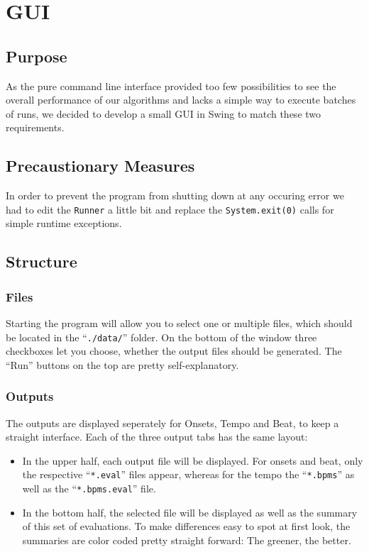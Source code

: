 \chapter{GUI} \label{cpt:gui}

\section{Purpose}
As the pure command line interface provided too few possibilities to see the
overall performance of our algorithms and lacks a simple way to execute
batches of runs, we decided to develop a small GUI in Swing to match these two
requirements.

\section{Precaustionary Measures}
In order to prevent the program from shutting down at any occuring error we had
to edit the \texttt{Runner} a little bit and replace the
\texttt{System.exit(0)} calls for simple runtime exceptions.

\section{Structure}
\subsection{Files}
Starting the program will allow you to select one or multiple files, which
should be located in the ``\texttt{./data/}'' folder. On the bottom of the
window three checkboxes let you choose, whether the output files should be
generated. The ``Run'' buttons on the top are pretty self-explanatory.

\subsection{Outputs}
The outputs are displayed seperately for Onsets, Tempo and Beat, to keep a
straight interface. Each of the three output tabs has the same layout:

\begin{itemize}
  \item In the upper half, each output file will be displayed. For onsets and
  beat, only the respective ``\texttt{*.eval}'' files appear, whereas for the
  tempo the ``\texttt{*.bpms}'' as well as the ``\texttt{*.bpms.eval}'' file.
  \item In the bottom half, the selected file will be displayed as well as the
  summary of this set of evaluations. To make differences easy to spot at first
  look, the summaries are color coded pretty straight forward: The greener, the
  better.
\end{itemize}
